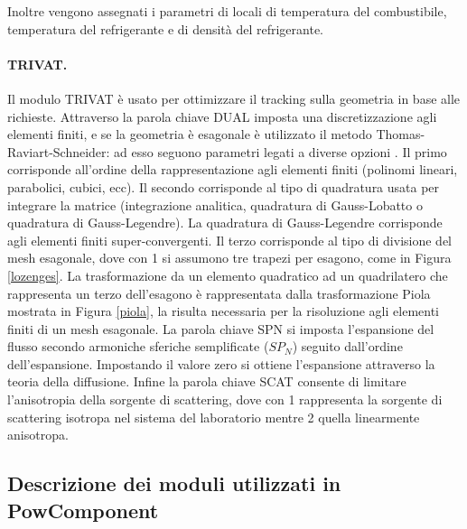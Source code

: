 Inoltre vengono assegnati i parametri di locali di temperatura del combustibile, 
temperatura del refrigerante e di densità del refrigerante.
\paragraph{TRIVAT.}
Il modulo TRIVAT è usato per ottimizzare il tracking sulla geometria in base 
alle richieste.
Attraverso la parola chiave DUAL imposta una discretizzazione agli elementi 
finiti, e se la geometria è esagonale è utilizzato il metodo 
Thomas-Raviart-Schneider: ad esso seguono parametri legati a diverse opzioni \cite{hebert2008raviart}. 
Il primo corrisponde all'ordine della rappresentazione agli elementi finiti 
(polinomi lineari, parabolici, cubici, ecc).
Il secondo corrisponde al tipo di quadratura usata per integrare la matrice 
(integrazione analitica, quadratura di 
Gauss-Lobatto o quadratura di Gauss-Legendre).
La quadratura di Gauss-Legendre corrisponde agli elementi finiti 
super-convergenti.
Il terzo corrisponde al tipo di divisione del mesh esagonale, dove con 1 si 
assumono tre trapezi per esagono, come in Figura \ref{lozenges}.
La trasformazione da un elemento quadratico ad un quadrilatero che rappresenta 
un terzo dell'esagono è rappresentata 
dalla trasformazione Piola mostrata in Figura \ref{piola}, la risulta necessaria per 
la risoluzione agli elementi finiti di un
mesh esagonale.
La parola chiave SPN si imposta l'espansione del flusso secondo armoniche 
sferiche semplificate ($SP_N$) seguito dall'ordine dell'espansione. Impostando 
il valore zero si ottiene l'espansione attraverso la teoria della diffusione.
Infine la parola chiave SCAT consente di limitare l'anisotropia della sorgente 
di scattering, dove con 1 rappresenta la sorgente di scattering isotropa nel 
sistema del laboratorio mentre 2 quella linearmente anisotropa.

\subsection{Descrizione dei moduli utilizzati in PowComponent}
